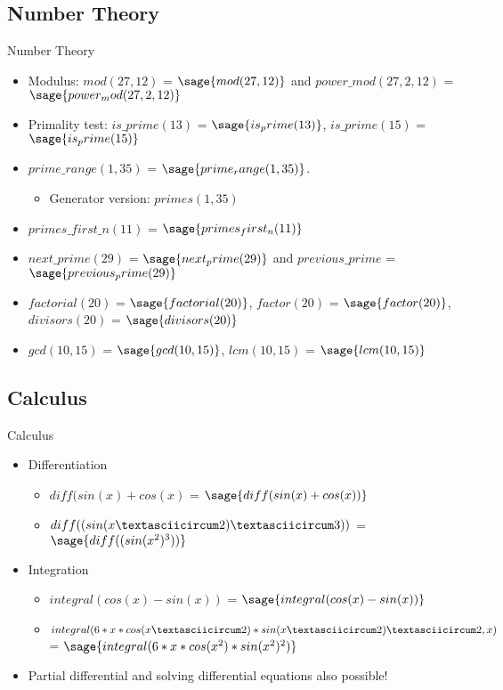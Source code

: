 \documentclass{beamer}
\begin{document}
\subsection{Number Theory}
\begin{frame}{Number Theory}
 \begin{itemize}
  \item Modulus: $mod(27, 12)$ = $\sage{mod(27, 12)}$ and $power \_ mod(27, 2, 12)$ = $\sage{power_mod(27, 2, 12)}$
  \item Primality test: $is \_ prime(13)$ = $\sage{is_prime(13)}$, $is \_ prime(15)$ = $\sage{is_prime(15)}$
  \item $prime \_ range(1, 35)$ = $\sage{prime_range(1, 35)}$.
  \begin{itemize}
    \item Generator version: $primes(1, 35)$
  \end{itemize}
  \item $primes \_ first \_ n(11)$ = $\sage{primes_first_n(11)}$
  \item $next \_ prime(29)$ = $\sage{next_prime(29)}$ and $previous \_ prime$ = $\sage{previous_prime(29)}$
  \item $factorial(20)$ = $\sage{factorial(20)}$, $factor(20)$ = $\sage{factor(20)}$, $divisors(20)$  = $\sage{divisors(20)}$
  \item $gcd(10, 15)$ = $\sage{gcd(10, 15)}$, $lcm(10, 15)$ = $\sage{lcm(10, 15)}$
 \end{itemize}
\end{frame}

\subsection{Calculus}
\begin{frame}{Calculus}
  \begin{itemize}
    \item Differentiation
    \begin{itemize}
      \item $diff(sin(x) + cos(x)$ = $\sage{diff(sin(x) + cos(x))}$
      \item $diff((sin(x \textasciicircum 2) \textasciicircum 3))$ = $\sage{diff((sin(x^2)^3))}$
    \end{itemize}
    \item Integration
    \begin{itemize}
      \item $integral(cos(x) - sin(x))$ = $\sage{integral(cos(x) - sin(x))}$
      \item $integral(6*x*cos(x \textasciicircum 2)*sin(x \textasciicircum 2) \textasciicircum 2, x)$ = $\sage{integral(6*x*cos(x^2)*sin(x^2)^2)}$
    \end{itemize}
    \item Partial differential and solving differential equations also possible!
  \end{itemize}
\end{frame}
\end{document}
